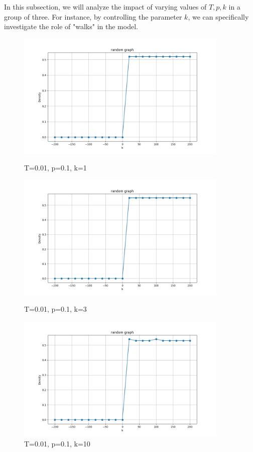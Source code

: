 \documentclass[11pt]{book}
\begin{document}
In this subsection, we will analyze the impact of varying values of $T,p,k$ in a group of three. For instance, by controlling the parameter $k$, we can specifically investigate the role of "walks" in the model.
\begin{figure}
    \centering
    \begin{minipage}{0.45\textwidth}
        \centering
        \includegraphics[width=0.9\textwidth]{rg.T=0.01,p=0.1,k=1.png} %
        \caption{T=0.01, p=0.1, k=1}
        \label{fig14}
    \end{minipage}\hfill
    \begin{minipage}{0.45\textwidth}
        \centering
        \includegraphics[width=0.9\textwidth]{rg.T=0.01, p=0.1 k=3.png} %
        \caption{T=0.01, p=0.1, k=3}
        \label{fig15}
    \end{minipage}
    \begin{minipage}{0.45\textwidth}
        \centering
        \includegraphics[width=0.9\textwidth]{rg.T=0.01, p=0.1 k=10.png} %
        \caption{T=0.01, p=0.1, k=10}
        \label{fig16}
    \end{minipage}\hfill
\end{figure}
\end{document}
